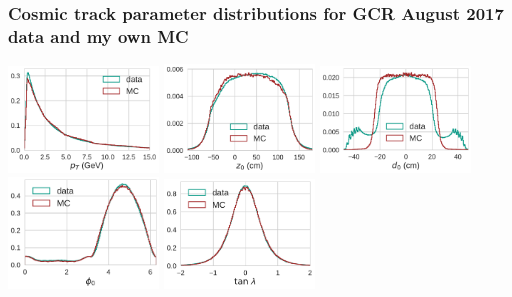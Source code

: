 \documentclass[18pt, aspectratio=169]{beamer}
\begin{document}
\begin{frame}
  \frametitle{Cosmic track parameter distributions for GCR August 2017 data and my own MC}
  \begin{center}
    \includegraphics[width=0.3\textwidth]{figures/distributions/gcr_august_2017_pt_distribution_normed=True.pdf}
    \includegraphics[width=0.3\textwidth]{figures/distributions/gcr_august_2017_z0_distribution_normed=True.pdf}
    \includegraphics[width=0.3\textwidth]{figures/distributions/gcr_august_2017_d0_distribution_normed=True.pdf}\\
    \includegraphics[width=0.3\textwidth]{figures/distributions/gcr_august_2017_phi0_distribution_normed=True.pdf}
    \includegraphics[width=0.3\textwidth]{figures/distributions/gcr_august_2017_tan_lambda_distribution_normed=True.pdf}
  \end{center}
\end{frame}
\end{document}
